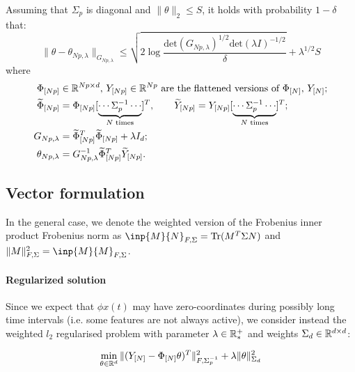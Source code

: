 \documentclass{article}
\begin{document}
\begin{lemma}
Assuming that $\Sigma_p$ is diagonal and $\|\theta\|_2\leq S$, it holds with probability $1-\delta$ that:
\begin{equation*}
    \|\theta - \theta_{Np,\lambda}\|_{G_{Np,\lambda}} \leq \sqrt{2\log \frac{\text{det}(G_{Np,\lambda})^{1/2}\text{det}(\lambda I)^{-1/2}}{\delta}} + \lambda^{1/2}S
\end{equation*}
where
\begin{align*}
    \Phi_{[Np]}& \in\mathbb{R}^{Np\times d},\, Y_{[Np]}\in \mathbb{R}^{Np} \text{ are the flattened versions of $\Phi_{[N]}$, $Y_{[N]}$};\\
    \widetilde{\Phi}_{[Np]} &= \Phi_{[Np]} [\underbrace{\cdots \Sigma_p^{-1} \cdots}_{\text{$N$ times}}]^T, \qquad  \widetilde{Y}_{[Np]} = Y_{[Np]} [\underbrace{\cdots \Sigma_p^{-1} \cdots}_{\text{$N$ times}}]^T;\\
    G_{Np, \lambda} &= \widetilde{\Phi}^T_{[Np]}\widetilde{\Phi}_{[Np]} + \lambda I_d;\\
    \theta_{Np,\lambda} &= G_{Np, \lambda}^{-1} \widetilde{\Phi}^T_{[Np]}\widetilde{Y}_{[Np]}.
\end{align*}
\end{lemma}

\subsection{Vector formulation}
In the general case, we denote the weighted version of the Frobenius inner product Frobenius norm as $\inp{M}{N}_{F,\Sigma} = \Tr (M^T \Sigma N)$ and $\|M\|_{F,\Sigma}^2 = \inp{M}{M}_{F,\Sigma}$.

\paragraph{Regularized solution} Since we expect that $\phi x(t)$ may have zero-coordinates during possibly long time intervals (i.e. some features are not always active), we consider instead the weighted $l_2$ regularised problem with parameter $\lambda\in\mathbb{R}^+_*$ and weights $\Sigma_d\in\mathbb{R}^{d\times d}$:

\begin{equation}
    \label{eq:regression_min}
    \min_{\theta\in\mathbb{R}^d} \|(Y_{[N]} -\Phi_{[N]}\theta)^T\|_{F,\Sigma_p^{-1}}^2 + \lambda\|\theta\|_{\Sigma_d}^2
\end{equation}

\end{document}

